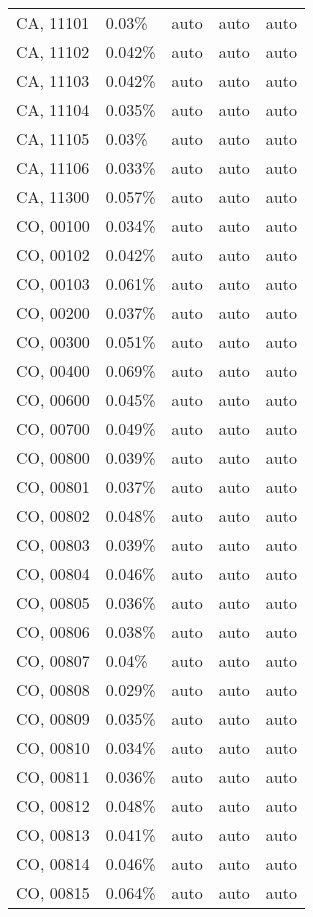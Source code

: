\begin{longtable}[]{@{}lllll@{}}
CA, 11101 & 0.03\% & auto & auto & auto \\
CA, 11102 & 0.042\% & auto & auto & auto \\
CA, 11103 & 0.042\% & auto & auto & auto \\
CA, 11104 & 0.035\% & auto & auto & auto \\
CA, 11105 & 0.03\% & auto & auto & auto \\
CA, 11106 & 0.033\% & auto & auto & auto \\
CA, 11300 & 0.057\% & auto & auto & auto \\
CO, 00100 & 0.034\% & auto & auto & auto \\
CO, 00102 & 0.042\% & auto & auto & auto \\
CO, 00103 & 0.061\% & auto & auto & auto \\
CO, 00200 & 0.037\% & auto & auto & auto \\
CO, 00300 & 0.051\% & auto & auto & auto \\
CO, 00400 & 0.069\% & auto & auto & auto \\
CO, 00600 & 0.045\% & auto & auto & auto \\
CO, 00700 & 0.049\% & auto & auto & auto \\
CO, 00800 & 0.039\% & auto & auto & auto \\
CO, 00801 & 0.037\% & auto & auto & auto \\
CO, 00802 & 0.048\% & auto & auto & auto \\
CO, 00803 & 0.039\% & auto & auto & auto \\
CO, 00804 & 0.046\% & auto & auto & auto \\
CO, 00805 & 0.036\% & auto & auto & auto \\
CO, 00806 & 0.038\% & auto & auto & auto \\
CO, 00807 & 0.04\% & auto & auto & auto \\
CO, 00808 & 0.029\% & auto & auto & auto \\
CO, 00809 & 0.035\% & auto & auto & auto \\
CO, 00810 & 0.034\% & auto & auto & auto \\
CO, 00811 & 0.036\% & auto & auto & auto \\
CO, 00812 & 0.048\% & auto & auto & auto \\
CO, 00813 & 0.041\% & auto & auto & auto \\
CO, 00814 & 0.046\% & auto & auto & auto \\
CO, 00815 & 0.064\% & auto & auto & auto \\

\end{longtable}
